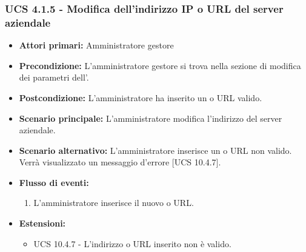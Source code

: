 \subsubsection{UCS 4.1.5 - Modifica dell'indirizzo IP o URL del server aziendale}
\begin{itemize}
	\item \textbf{Attori primari:} Amministratore gestore
	\item \textbf{Precondizione:} L'amministratore gestore si trova nella sezione di modifica dei parametri dell'.
	\item \textbf{Postcondizione:} L'amministratore ha inserito un  o URL valido.
	\item \textbf{Scenario principale:} L'amministratore modifica l'indirizzo del server aziendale.
	\item \textbf{Scenario alternativo:} L'amministratore inserisce un  o URL non valido. Verrà visualizzato un messaggio d'errore [UCS 10.4.7].
	\item \textbf{Flusso di eventi:}
	\begin{enumerate}
		\item L'amministratore inserisce il nuovo  o URL.
	\end{enumerate}
	\item \textbf{Estensioni:}
	\begin{itemize}
		\item UCS 10.4.7 - L'indirizzo  o URL inserito non è valido.
	\end{itemize}
\end{itemize}



